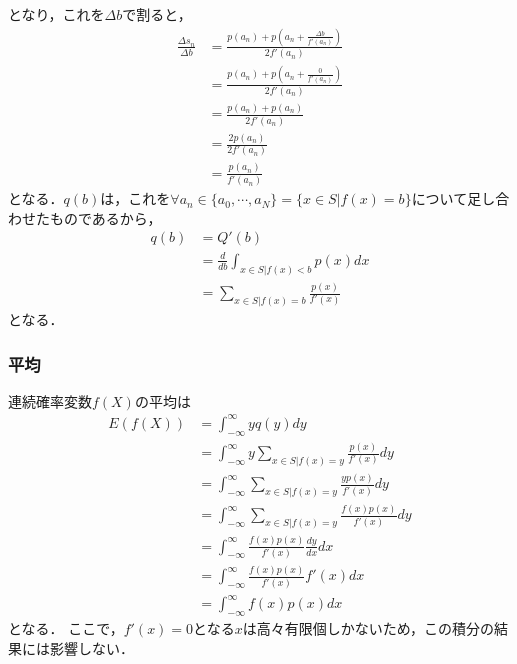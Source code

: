 \documentclass[dvipdfmx]{jsarticle}
\begin{document}
となり，これを$\Delta b$で割ると，
 \begin{align}
  \frac{\Delta s_n}{\Delta b}&=\frac{p\left(a_n\right)+p\left(a_n+\frac{\Delta b}{f'\left(a_n\right)}\right)}{2f'\left(a_n\right)}\nonumber\\
  &=\frac{p\left(a_n\right)+p\left(a_n+\frac{0}{f'\left(a_n\right)}\right)}{2f'\left(a_n\right)}\nonumber\\
  &=\frac{p\left(a_n\right)+p\left(a_n\right)}{2f'\left(a_n\right)}\nonumber\\
  &=\frac{2p\left(a_n\right)}{2f'\left(a_n\right)}\nonumber\\
  &=\frac{p\left(a_n\right)}{f'\left(a_n\right)}
 \end{align}
となる．$q\left(b\right)$は，これを$\forall a_n\in\{a_0,\cdots,a_N\}=\{x\in S|f\left(x\right)=b\}$について足し合わせたものであるから，
 \begin{align}
  q\left(b\right)&=Q'\left(b\right)\nonumber\\
  &=\frac{d}{db}\int_{x\in S|f\left(x\right)<b}p\left(x\right)dx\nonumber\\
  &=\sum_{x\in S|f\left(x\right)=b}\frac{p\left(x\right)}{f'\left(x\right)}
 \end{align}
となる．
 \subsubsection{平均}
連続確率変数$f\left(X\right)$の平均は
 \begin{align}
  E\left(f\left(X\right)\right)&=\int_{-\infty}^\infty yq\left(y\right)dy\nonumber\\
  &=\int_{-\infty}^\infty y\sum_{x\in S|f\left(x\right)=y}\frac{p\left(x\right)}{f'\left(x\right)}dy\nonumber\\
  &=\int_{-\infty}^\infty\sum_{x\in S|f\left(x\right)=y}\frac{yp\left(x\right)}{f'\left(x\right)}dy\nonumber\\
  &=\int_{-\infty}^\infty\sum_{x\in S|f\left(x\right)=y}\frac{f\left(x\right)p\left(x\right)}{f'\left(x\right)}dy\nonumber\\
  &=\int_{-\infty}^\infty\frac{f\left(x\right)p\left(x\right)}{f'\left(x\right)}\frac{dy}{dx}dx\nonumber\\
  &=\int_{-\infty}^\infty\frac{f\left(x\right)p\left(x\right)}{f'\left(x\right)}f'\left(x\right)dx\nonumber\\
  &=\int_{-\infty}^\infty f\left(x\right)p\left(x\right)dx\label{ContinuousFunctionAverate}
 \end{align}
となる．
ここで，$f'\left(x\right)=0$となる$x$は高々有限個しかないため，この積分の結果には影響しない．
\end{document}
